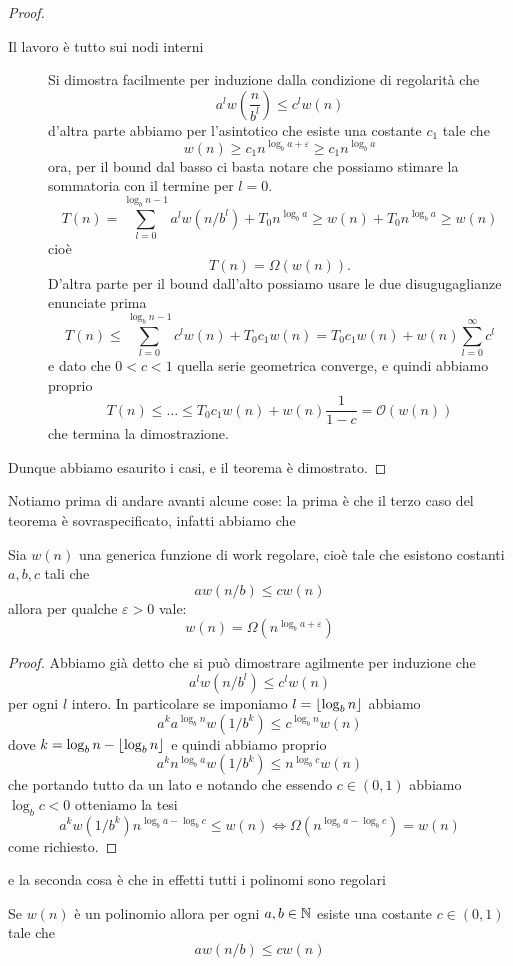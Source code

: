 \documentclass[11pt]{scrartcl}
\newcommand{\bigo}[1]{\mathcal{O}\!\left(#1\right)}
\newcommand{\bigomega}[1]{\Omega\!\left(#1\right)}
\begin{document}
\begin{proof}
\begin{description}
			\item[Il lavoro è tutto sui nodi interni] Si dimostra facilmente per induzione dalla condizione di regolarità che 
			$$ a^l w\left(\frac{n}{b^l}\right)\le c^l w(n)$$
			d'altra parte abbiamo per l'asintotico che esiste una costante $c_1$ tale che
			$$w(n)\ge c_1 n^{\log_b a + \varepsilon}\ge c_1 n^{\log_b a }$$
			ora, per il bound dal basso ci basta notare che possiamo stimare la sommatoria con il termine per $l=0$.
			$$T(n)=\sum_{l=0}^{\log_b n -1}a^l w\left(n/b^l\right)+T_0 n^{\log_b a}\ge w(n)+T_0 n^{\log_b a}\ge w(n)$$
			cioè 
			$$T(n)=\bigomega{w(n)}.$$
			D'altra parte per il bound dall'alto possiamo usare le due disugugaglianze enunciate prima
			$$T(n)\le \sum_{l=0}^{\log_b n -1}c^l w(n)+T_0c_1 w(n)=T_0c_1w(n)+w(n)\sum_{l=0}^{\infty}c^l$$
			e dato che $0<c<1$ quella serie geometrica converge, e quindi abbiamo proprio
			$$T(n)\le \dots \le T_0c_1w(n)+w(n)\frac{1}{1-c}=\bigo{w(n)}$$
			che termina la dimostrazione.
		\end{description}
		Dunque abbiamo esaurito i casi, e il teorema è dimostrato.
	\end{proof}
	Notiamo prima di andare avanti alcune cose: la prima è che il terzo caso del teorema è sovraspecificato, infatti abbiamo che
	\begin{lemma}
		Sia $w(n)$ una generica funzione di work regolare, cioè tale che esistono costanti $a,b,c$ tali che
		$$aw\left(n/b\right)\le cw(n)$$
		allora per qualche $\varepsilon>0$ vale:
		$$w(n)=\bigomega{n^{\log_b a+\varepsilon}}$$
	\end{lemma}
	\begin{proof}
		Abbiamo già detto che si può dimostrare agilmente per induzione che
		$$a^lw(n/b^l)\le c^l w(n)$$
		per ogni $l$ intero. In particolare se imponiamo $l=\left\lfloor \log_b n \right\rfloor$ abbiamo 
		$$a^ka^{\log_b n}w\left(1/b^k\right)\le c^{\log_b n} w(n)$$
		dove $k=\log_b n -\left\lfloor \log_b n \right\rfloor$ e quindi abbiamo proprio
		$$a^k n^{\log_b a}w\left(1/b^k\right)\le n^{\log_b c} w(n)$$
		che portando tutto da un lato e notando che essendo $c\in (0,1)$ abbiamo $\log_b c<0$ otteniamo la tesi
		$$a^k w\left(1/b^k\right)n^{\log_b a -\log_b c}\le w(n) \iff \bigomega{n^{\log_b a-\log_b c}}=w(n)$$
		come richiesto.
	\end{proof}
	e la seconda cosa è che in effetti tutti i polinomi sono regolari
	\begin{lemma}
		Se $w(n)$ è un polinomio allora per ogni $a,b\in \mathbb N$ esiste una costante $c\in (0,1)$ tale che
		$$aw(n/b)\le c w(n)$$
	\end{lemma}
\end{document}

